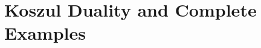 \documentclass[11pt]{memoir}
\begin{document}












\part{Koszul Duality and Complete Examples}












\appendix





\end{document}
